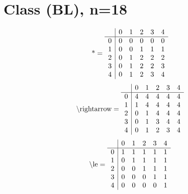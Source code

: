 \documentclass[11pt]{article}
\begin{document}
\section{Class (BL), n=18}
\[\text{*} = 
\begin{array}{r | r r r r r}
 & 0 & 1 & 2 & 3 & 4 \\ \hline
0 & 0 & 0 & 0 & 0 & 0 \\
1 & 0 & 0 & 1 & 1 & 1 \\
2 & 0 & 1 & 2 & 2 & 2 \\
3 & 0 & 1 & 2 & 2 & 3 \\
4 & 0 & 1 & 2 & 3 & 4 \\
\end{array}
\]
\[\text{\textbackslash rightarrow} = 
\begin{array}{r | r r r r r}
 & 0 & 1 & 2 & 3 & 4 \\ \hline
0 & 4 & 4 & 4 & 4 & 4 \\
1 & 1 & 4 & 4 & 4 & 4 \\
2 & 0 & 1 & 4 & 4 & 4 \\
3 & 0 & 1 & 3 & 4 & 4 \\
4 & 0 & 1 & 2 & 3 & 4 \\
\end{array}
\]
\[\text{\textbackslash le} = 
\begin{array}{r | r r r r r}
 & 0 & 1 & 2 & 3 & 4 \\ \hline
0 & 1 & 1 & 1 & 1 & 1 \\
1 & 0 & 1 & 1 & 1 & 1 \\
2 & 0 & 0 & 1 & 1 & 1 \\
3 & 0 & 0 & 0 & 1 & 1 \\
4 & 0 & 0 & 0 & 0 & 1 \\
\end{array}
\]
\end{document}
